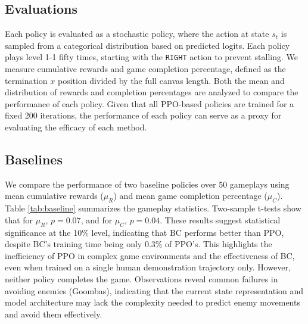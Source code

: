 \documentclass{article}
\begin{document}
\subsection{Evaluations}
Each policy is evaluated as a stochastic policy, where the action 
at state $s_t$ is sampled from a categorical distribution based on 
predicted logits. Each policy plays level 1-1 fifty times, starting 
with the \texttt{RIGHT} action to prevent stalling. We measure 
cumulative rewards and game completion percentage, defined as the 
termination $x$ position divided by the full canvas length. Both 
the mean and distribution of rewards and completion percentages 
are analyzed to compare the performance of each policy.
Given that all PPO-based policies are trained for a fixed 200 iterations,
the performance of each policy can serve as a proxy for evaluating the
efficacy of each method.


\subsection{Baselines}

We compare the performance of two baseline policies over 50 gameplays 
using mean cumulative rewards ($\mu_R$) and mean game completion 
percentage ($\mu_C$). Table \ref{tab:baseline} summarizes the gameplay 
statistics. Two-sample t-tests show that for $\mu_R$, $p=0.07$, and 
for $\mu_C$, $p=0.04$. These results suggest statistical significance 
at the 10\% level, indicating that BC performs better than PPO, despite 
BC's training time being only 0.3\% of PPO's. This highlights the 
inefficiency of PPO in complex game environments and the effectiveness 
of BC, even when trained on a single human demonstration trajectory only. 
However, neither policy completes the game. Observations reveal common 
failures in avoiding enemies (Goombas), indicating that the current 
state representation and model architecture may lack the complexity 
needed to predict enemy movements and avoid them effectively.


\begin{table}[htbp]
      \centering
      \caption{Performance of baseline policies}
      \label{tab:baseline}
\end{table}
\end{document}
